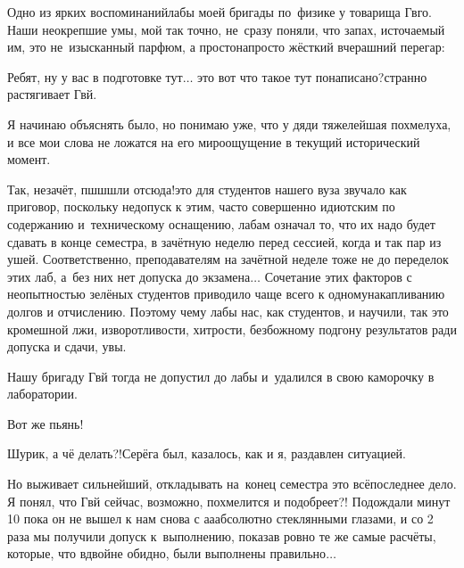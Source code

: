 \vspace{1.0cm}

Одно из ярких воспоминаний\mdash лабы моей бригады по~физике у товарища Гв\sdash го. Наши неокрепшие умы, мой так точно, не~сразу поняли, что запах, источаемый им, это не~изысканный парфюм, а просто\sdash напросто жёсткий вчерашний перегар:

\diagdash Ребят, ну у вас в подготовке тут$\ldots$ это вот что такое тут понаписано?\mdash странно растягивает Гв\sdash й.

Я начинаю объяснять было, но понимаю уже, что у дяди тяжелейшая похмелуха, и все мои слова не ложатся на его мироощущение в текущий исторический момент.

\diagdash Так, незачёт, пш\sdash ш\sdash шли отсюда!\mdash это для студентов нашего вуза звучало как приговор, поскольку недопуск к этим, часто совершенно идиотским по содержанию и~техническому оснащению, лабам означал то, что их надо будет сдавать в конце семестра, в зачётную неделю перед сессией, когда и так пар из ушей. Соответственно, преподавателям на зачётной неделе тоже не до переделок этих лаб, а~без них нет допуска до экзамена$\ldots$ Сочетание этих факторов с неопытностью зелёных студентов приводило чаще всего к одному\mdash накапливанию долгов и отчислению. Поэтому чему лабы нас, как студентов, и научили, так это кромешной лжи, изворотливости, хитрости, безбожному подгону результатов ради допуска и сдачи, увы.

Нашу бригаду Гв\sdash й тогда не допустил до лабы и~удалился в свою каморочку в лаборатории. 

\diagdash Вот же пьянь!

\diagdash Шурик, а чё делать?!\mdash Серёга был, казалось, как и я, раздавлен ситуацией.

Но выживает сильнейший, откладывать на~конец семестра это всё\mdash последнее дело. Я понял, что Гв\sdash й сейчас, возможно, похмелится и подобреет?! Подождали минут 10 пока он не вышел к нам снова с а\sdash а\sdash абсолютно стеклянными глазами, и со 2 раза мы получили допуск к~выполнению, показав ровно те же самые расчёты, которые, что вдвойне обидно, были выполнены правильно$\ldots$

\vspace{1.0cm}

